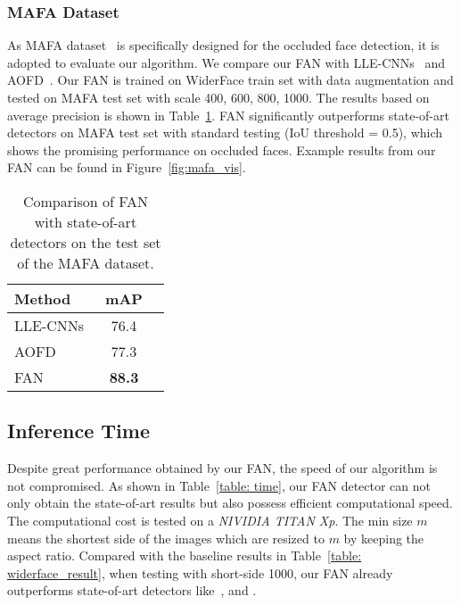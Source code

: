 \documentclass[10pt,twocolumn,letterpaper]{article}
\begin{document}
\subsubsection{MAFA Dataset} 
As MAFA dataset~\cite{Ge_2017_CVPR} is specifically designed for the occluded face detection, it is adopted to evaluate our algorithm. We compare our FAN with LLE-CNNs~\cite{Ge_2017_CVPR} and AOFD~\cite{chen2017masquer}. Our FAN is trained on WiderFace train set with data augmentation and tested on MAFA test set with scale {400, 600, 800, 1000}. The results based on average precision is shown in Table~\ref{table: mafa_result}. FAN significantly outperforms state-of-art detectors on MAFA test set with standard testing (IoU threshold = 0.5), which shows the promising performance on occluded faces. Example results from our FAN can be found in Figure~\ref{fig:mafa_vis}.

\begin{table}[t]
\begin{center}
\begin{tabular}{|l|c|c|}
\hline
Method & mAP \\
\hline
LLE-CNNs~\cite{Ge_2017_CVPR} & 76.4 \\
AOFD~\cite{chen2017masquer} & 77.3 \\
\hline
FAN & \textbf{88.3} \\
\hline
\end{tabular}
\end{center}
\caption{Comparison of FAN with state-of-art detectors on the test set of the MAFA dataset.}
\label{table: mafa_result}
\end{table}

\subsection{Inference Time}
Despite great performance obtained by our FAN, the speed of our algorithm is not compromised. As shown in Table~\ref{table: time}, our FAN detector can not only obtain the state-of-art results but also possess efficient computational speed. The computational cost is tested on a \emph{NIVIDIA TITAN Xp}. The min size $m$ means the shortest side of the images which are resized to $m$ by keeping the aspect ratio. Compared with the baseline results in Table~\ref{table: widerface_result}, when testing with short-side 1000, our FAN already outperforms state-of-art detectors like~\cite{najibi2017ssh}, \cite{zhang2017s3fd} and \cite{Hu_2017_CVPR}. 

\begin{table}[t]
\begin{center}
\end{center}
\caption{The inference time and precision with respect to different input sizes for our FAN.}
\label{table: time}
\end{table}
\end{document}
